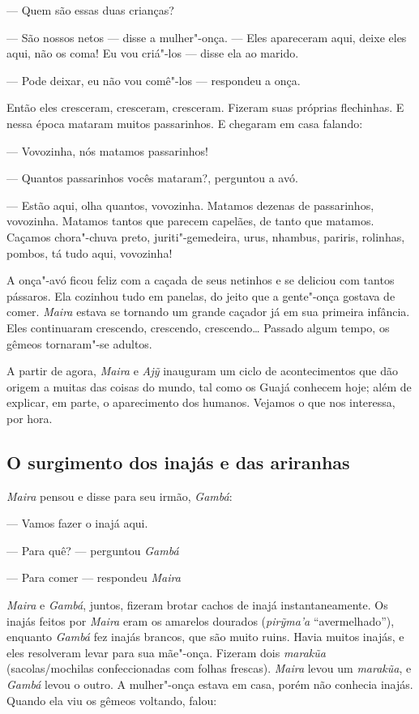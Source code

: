 --- Quem são essas duas crianças?

--- São nossos netos --- disse a mulher"-onça. --- Eles apareceram aqui,
deixe eles aqui, não os coma! Eu vou criá"-los --- disse ela ao
marido.

--- Pode deixar, eu não vou comê"-los --- respondeu a onça.

Então eles cresceram, cresceram, cresceram. Fizeram suas próprias
flechinhas. E nessa época mataram muitos passarinhos. E chegaram em casa
falando:

--- Vovozinha, nós matamos passarinhos!

--- Quantos passarinhos vocês mataram?, perguntou a avó.

--- Estão aqui, olha quantos, vovozinha. Matamos dezenas de passarinhos,
vovozinha. Matamos tantos que parecem capelães, de tanto que matamos.
Caçamos chora"-chuva preto, juriti"-gemedeira, urus, nhambus, pariris,
rolinhas, pombos, tá tudo aqui, vovozinha!

A onça"-avó ficou feliz com a caçada de seus netinhos e se deliciou com
tantos pássaros. Ela cozinhou tudo em panelas, do jeito que a gente"-onça
gostava de comer. \emph{Maira} estava se tornando um grande caçador já em sua
primeira infância. Eles continuaram crescendo, crescendo, crescendo\ldots{}
Passado algum tempo, os gêmeos tornaram"-se adultos.

\asterisc

A partir de agora, \emph{Maira} e \emph{Ajỹ} inauguram um ciclo de
acontecimentos que dão origem a muitas das coisas do mundo, tal como os
Guajá conhecem hoje; além de explicar, em parte, o aparecimento dos
humanos. Vejamos o que nos interessa, por hora.

\subsection{O surgimento dos inajás e das ariranhas}

\forceindent\emph{Maira} pensou e disse para seu irmão, \emph{Gambá}:

--- Vamos fazer o inajá aqui.

--- Para quê? --- perguntou \emph{Gambá}

--- Para comer --- respondeu \emph{Maira}

\emph{Maira} e \emph{Gambá}, juntos, fizeram brotar cachos de inajá
instantaneamente. Os inajás feitos por \emph{Maira} eram os amarelos
dourados (\emph{pirỹma'a} ``avermelhado''), enquanto \emph{Gambá} fez
inajás brancos, que são muito ruins. Havia muitos inajás, e eles
resolveram levar para sua mãe"-onça. Fizeram dois \emph{marakũa}
(sacolas/mochilas confeccionadas com folhas frescas). \emph{Maira} levou
um \emph{marakũa}, e \emph{Gambá} levou o outro. A mulher"-onça estava em
casa, porém não conhecia inajás. Quando ela viu os gêmeos voltando,
falou:

